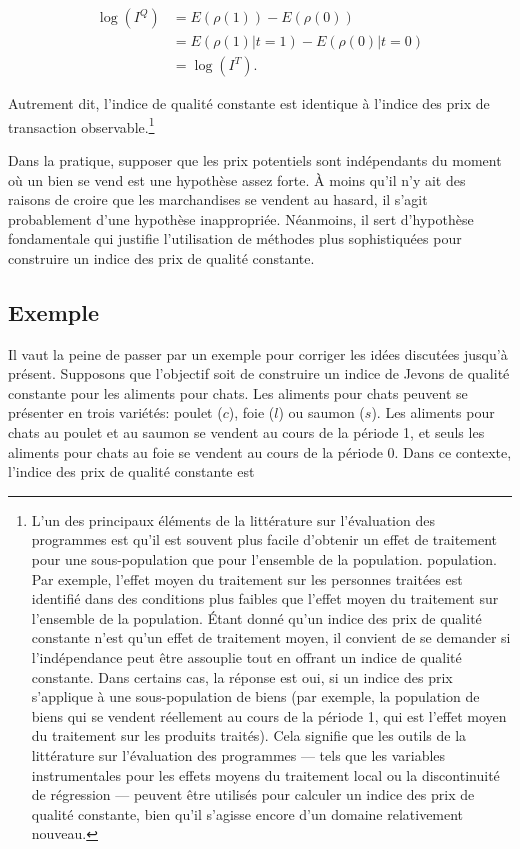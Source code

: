 \documentclass[
]{article}
\begin{document}
\begin{align*}
\log (I^{Q}) &= E(\rho(1)) - E(\rho(0)) \\
&= E(\rho(1) | t = 1) - E(\rho(0) | t = 0) \\
&= \log (I^{T}).
\end{align*}

Autrement dit, l'indice de qualité constante est identique à l'indice des prix de transaction observable.\footnote{L'un des principaux éléments de la littérature sur l'évaluation des programmes est qu'il est souvent plus facile d'obtenir un effet de traitement pour une sous-population que pour l'ensemble de la population. population. Par exemple, l'effet moyen du traitement sur les personnes traitées est identifié dans des conditions plus faibles que l'effet moyen du traitement sur l'ensemble de la population. Étant donné qu'un indice des prix de qualité constante n'est qu'un effet de traitement moyen, il convient de se demander si l'indépendance peut être assouplie tout en offrant un indice de qualité constante. Dans certains cas, la réponse est oui, si un indice des prix s'applique à une sous-population de biens (par exemple, la population de biens qui se vendent réellement au cours de la période 1, qui est l'effet moyen du traitement sur les produits traités). Cela signifie que les outils de la littérature sur l'évaluation des programmes --- tels que les variables instrumentales pour les effets moyens du traitement local ou la discontinuité de régression --- peuvent être utilisés pour calculer un indice des prix de qualité constante, bien qu'il s'agisse encore d'un domaine relativement nouveau.}

Dans la pratique, supposer que les prix potentiels sont indépendants du moment où un bien se vend est une hypothèse assez forte. À moins qu'il n'y ait des raisons de croire que les marchandises se vendent au hasard, il s'agit probablement d'une hypothèse inappropriée. Néanmoins, il sert d'hypothèse fondamentale qui justifie l'utilisation de méthodes plus sophistiquées pour construire un indice des prix de qualité constante.

\hypertarget{exemple}{%
\subsection{Exemple}\label{exemple}}

Il vaut la peine de passer par un exemple pour corriger les idées discutées jusqu'à présent. Supposons que l'objectif soit de construire un indice de Jevons de qualité constante pour les aliments pour chats. Les aliments pour chats peuvent se présenter en trois variétés: poulet (\(c\)), foie (\(l\)) ou saumon (\(s\)). Les aliments pour chats au poulet et au saumon se vendent au cours de la période 1, et seuls les aliments pour chats au foie se vendent au cours de la période 0. Dans ce contexte, l'indice des prix de qualité constante est
\end{document}
